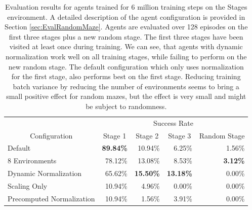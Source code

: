 \begin{table}[htp]
    \begin{center}
        \begin{tabular}{lrrrr}
            \toprule
            & \multicolumn{4}{c}{Success Rate} \\
            \cmidrule(lr){2-5}
            \multicolumn{1}{c}{Configuration} & \multicolumn{1}{c}{Stage 1} & \multicolumn{1}{c}{Stage 2} & \multicolumn{1}{c}{Stage 3} & \multicolumn{1}{c}{Random Stage} \\
            \midrule
            Default & \textbf{89.84\%} & 10.94\% & 6.25\% & 1.56\% \\
            8 Environments & 78.12\% & 13.08\% & 8.53\% & \textbf{3.12\%} \\
            Dynamic Normalization & 65.62\% & \textbf{15.50\%} & \textbf{13.18\%} & 0.00\% \\
            Scaling Only & 10.94\% & 4.96\% & 0.00\% & 0.00\% \\
            Precomputed Normalization & 10.94\% & 1.56\% & 3.91\% & 0.00\%\\
            \bottomrule
        \end{tabular}
        \caption[Evaluation Results for Agents trained on the Stages Environment]{Evaluation results for agents trained for 6 million training steps on the Stages environment. A detailed description of the agent configuration is provided in Section \ref{sec:EvalRandomMaze}. Agents are evaluated over 128 episodes on the first three stages plus a new random stage. The first three stages have been visited at least once during training. We can see, that agents with dynamic normalization work well on all training stages, while failing to perform on the new random stage. The default configuration which only uses normalization for the first stage, also performs best on the first stage. Reducing training batch variance by reducing the number of environments seems to bring a small positive effect for random mazes, but the effect is very small and might be subject to randomness.} \label{tab:Eval/RandomMaze}
    \end{center}
\end{table}

